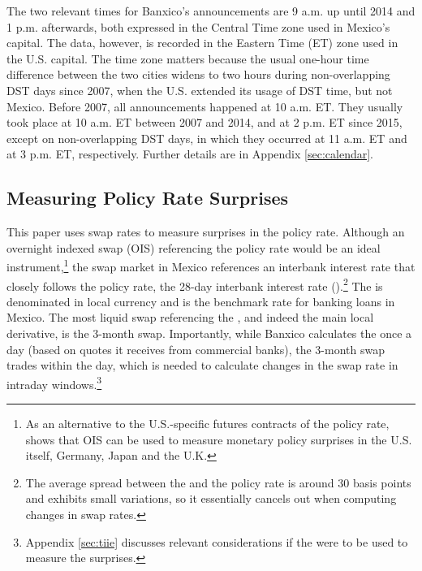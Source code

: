 \documentclass[a4paper,12pt]{article} 		%
\begin{document}
The two relevant times for Banxico's announcements are 9 a.m. up until 2014 and 1 p.m. afterwards, both expressed in the Central Time zone used in Mexico's capital. The data, however, is recorded in the Eastern Time (ET) zone used in the U.S. capital. The time zone matters because the usual one-hour time difference between the two cities widens to two hours during non-overlapping DST days since 2007, when the U.S. extended its usage of DST time, but not Mexico. Before 2007, all announcements happened at 10 a.m. ET. They usually took place at 10 a.m. ET between 2007 and 2014, and at 2 p.m. ET since 2015, except on non-overlapping DST days, in which they occurred at 11 a.m. ET and at 3 p.m. ET, respectively. 
Further details are in Appendix \ref{sec:calendar}.

\sectitlespace
\subsection{Measuring Policy Rate Surprises} \label{sec:prs}
\sectitlespace

This paper uses swap rates to measure surprises in the policy rate. Although an overnight indexed swap (OIS) referencing the policy rate would be an ideal instrument,\footnote{ As an alternative to the U.S.-specific futures contracts of the policy rate, \textcite{Lloyd:2018a} shows that OIS can be used to measure monetary policy surprises in the U.S. itself, Germany, Japan and the U.K.} the swap market in Mexico references an interbank interest rate that closely follows the policy rate, the 28-day interbank interest rate (\tiie).\footnote{The average spread between the \tiie{} and the policy rate is around 30 basis points and exhibits small variations, so it essentially cancels out when computing changes in swap rates.} The \tiie{} is denominated in local currency and is the benchmark rate for banking loans in Mexico. The most liquid swap referencing the \tiie{}, and indeed the main local derivative, is the 3-month swap. Importantly, while Banxico calculates the \tiie{} once a day (based on quotes it receives from commercial banks), the 3-month swap trades within the day, which is needed to calculate changes in the swap rate in intraday windows.\footnote{Appendix \ref{sec:tiie} discusses relevant considerations if the \tiie{} were to be used to measure the surprises.} 
\end{document}
